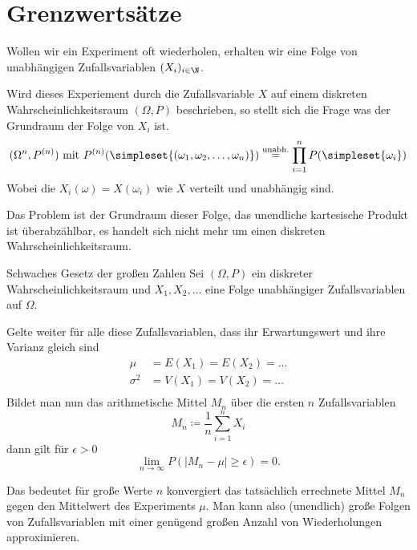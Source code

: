 \section{Grenzwertsätze}
Wollen wir ein Experiment oft wiederholen, erhalten wir eine Folge von unabhängigen Zufallsvariablen $(X_i)_{i\in\N}$.

Wird dieses Experiement durch die Zufallsvariable $X$ auf einem diskreten Wahrscheinlichkeitsraum $(\Omega,P)$ beschrieben, so stellt sich die Frage was der Grundraum der Folge von $X_i$ ist.
\begin{equation*}
	(\Omega^n,P^{(n)}) \text{ mit } P^{(n)}(\simpleset{(\omega_1,\omega_2,\ldots,\omega_n)})\overset{\text{unabh.}}=\prod_{i=1}^n P(\simpleset{\omega_i})
\end{equation*}
Wobei die $X_i(\omega)=X(\omega_i)$ wie $X$ verteilt und unabhängig sind.

Das Problem ist der Grundraum dieser Folge, das unendliche kartesische Produkt ist überabzählbar, es handelt sich nicht mehr um einen diskreten Wahrscheinlichkeitsraum. 


 


\begin{satz}{Schwaches Gesetz der großen Zahlen}
	Sei $(\Omega, P)$ ein diskreter Wahrscheinlichkeitsraum und $X_1,X_2,\ldots$ eine Folge unabhängiger Zufallsvariablen auf $\Omega$.

	Gelte weiter für alle diese Zufallsvariablen, dass ihr Erwartungswert und ihre Varianz gleich sind
	\begin{align*}
		\mu &= E(X_1)=E(X_2)=\ldots\\
		\sigma^2&=V(X_1)=V(X_2)=\ldots\\
	\end{align*}%
	Bildet man nun das arithmetische Mittel $M_n$ über die ersten $n$ Zufallsvariablen%
	\begin{equation*}
		M_n\coloneqq \frac1n\sum_{i=1}^nX_i
	\end{equation*}%
	dann gilt für $\epsilon > 0$%
	\begin{equation*}
		\lim_{n\to\infty}P(|M_n-\mu|\geq\epsilon)=0.
	\end{equation*}%
\end{satz}

Das bedeutet für große Werte $n$ konvergiert das tatsächlich errechnete Mittel $M_n$ gegen den Mittelwert des Experiments $\mu$. Man kann also (unendlich) große Folgen von Zufallsvariablen mit einer genügend großen Anzahl von Wiederholungen approximieren.





